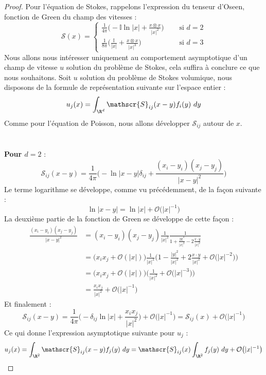 \begin{proof}
Pour l'équation de Stokes, rappelons l'expression du tenseur d'Oseen, fonction de Green du champ des vitesses :
$$ \mathscr{S}(x) = \begin{cases}
    \displaystyle  \frac{1}{4\pi } \Big(- \mathbb{I}\ln |x| + \frac{x\otimes x}{|x|^2}\Big) \quad &\text{ si } d = 2 \\
    \displaystyle  \frac{1}{8\pi } \Big(\frac{\mathbb{I}}{|x|} + \frac{x\otimes x}{|x|^3} \Big) &\text{ si } d=3
\end{cases}$$
Nous allons nous intéresser uniquement au comportement asymptotique d'un champ de vitesse $u$ solution du problème de Stokes, cela suffira à conclure ce que nous souhaitons.
Soit $u$ solution du problème de Stokes volumique, nous disposons de la formule de représentation suivante sur l'espace entier :
$$ u_j(x) = \int_{\R^d} \mathscr{S}_{ij}(x-y)f_i(y) \ dy $$
Comme pour l'équation de Poisson, nous allons développer $\mathscr{S}_{ij}$ autour de $x$.\\
\\
\\
\textbf{Pour $d=2$} :\\
$$\mathscr{S}_{ij}(x-y) = \frac{1}{4\pi} \Big( - \ln |x-y| \delta_{ij} + \frac{(x_i - y_i)(x_j - y_j)}{|x-y|^2} \Big) $$
Le terme logarithme se développe, comme vu précédemment, de la façon suivante :
$$\ln |x-y| = \ln|x| + \mathcal{O}\big( |x|^{-1} \big) $$
La deuxième partie de la fonction de Green se développe de cette façon :
\begin{align*}
    \frac{(x_i - y_i)(x_j - y_j)}{|x-y|^2} &= (x_i - y_i)(x_j - y_j) \frac{1}{|x|^2}\frac{1}{1 + \frac{|y|^2}{|x|^2} - 2\frac{x \cdot y}{|x|^2} } \\
    &= \Big( x_i x_j + \mathcal{O}(|x|) \Big) \frac{1}{|x|^2} \Big( 1 - \frac{|y|^2}{|x|^2} + 2 \frac{x \cdot y}{|x|^2} + \mathcal{O}\big(|x|^{-2} \big) \Big) \\
    &=  \Big( x_i x_j + \mathcal{O}(|x|) \Big)\Big( \frac{1}{|x|^2} + \mathcal{O}\big(|x|^{-3}\big) \Big) \\
    &= \frac{x_i x_j}{|x|^2} +  \mathcal{O}\big( |x|^{-1} \big)
\end{align*}
Et finalement :
$$ \mathscr{S}_{ij}(x-y) = \frac{1}{4\pi}\bigg(-\delta_{ij}\ln|x| + \frac{x_i x_j}{|x|^2}\bigg) + \mathcal{O}\big(|x|^{-1}\big) = \mathscr{S}_{ij}(x) + \mathcal{O}\big(|x|^{-1}\big) $$
Ce qui donne l'expression asymptotique suivante pour $u_j$ :
$$u_j(x) = \int_{\R^2} \mathscr{S}_{ij}(x-y) f_j(y) \ dy = \mathscr{S}_{ij}(x)\int_{\R^2} f_j(y) \ dy + \mathcal{O}\big(|x|^{-1}\big) $$

\end{proof}
